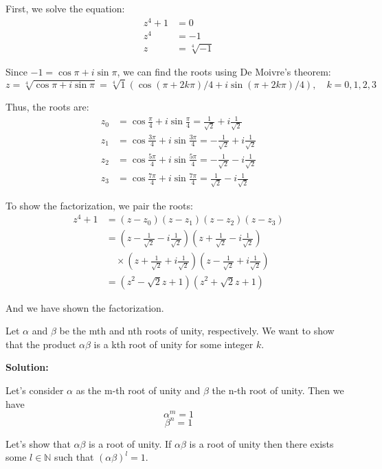 \documentclass[
	12pt, %
	fleqn, %
	a4paper, %
]{LegrandOrangeBook}
\begin{document}
First, we solve the equation:
\begin{align*}
z^4 + 1 &= 0 \\
z^4 &= -1 \\
z &= \sqrt[4]{-1}
\end{align*}

Since \( -1 = \cos \pi + i \sin \pi \), we can find the roots using De Moivre's theorem:
\[ z = \sqrt[4]{\cos \pi + i \sin \pi} = \sqrt[4]{1}(\cos (\pi + 2k\pi)/4 + i \sin (\pi + 2k\pi)/4), \quad k = 0,1,2,3 \]

Thus, the roots are:
\begin{align*}
z_0 &= \cos \frac{\pi}{4} + i \sin \frac{\pi}{4} = \frac{1}{\sqrt{2}} + i \frac{1}{\sqrt{2}} \\
z_1 &= \cos \frac{3\pi}{4} + i \sin \frac{3\pi}{4} = -\frac{1}{\sqrt{2}} + i \frac{1}{\sqrt{2}} \\
z_2 &= \cos \frac{5\pi}{4} + i \sin \frac{5\pi}{4} = -\frac{1}{\sqrt{2}} - i \frac{1}{\sqrt{2}} \\
z_3 &= \cos \frac{7\pi}{4} + i \sin \frac{7\pi}{4} = \frac{1}{\sqrt{2}} - i \frac{1}{\sqrt{2}}
\end{align*}

To show the factorization, we pair the roots:
\begin{align*}
z^4 + 1 &= (z - z_0)(z - z_1)(z - z_2)(z - z_3) \\
&= \left(z - \frac{1}{\sqrt{2}} - i \frac{1}{\sqrt{2}}\right)\left(z + \frac{1}{\sqrt{2}} - i \frac{1}{\sqrt{2}}\right) \\
&\quad \times \left(z + \frac{1}{\sqrt{2}} + i \frac{1}{\sqrt{2}}\right)\left(z - \frac{1}{\sqrt{2}} + i \frac{1}{\sqrt{2}}\right) \\
&= \left(z^2 - \sqrt{2}z + 1\right)\left(z^2 + \sqrt{2}z + 1\right)
\end{align*}

And we have shown the factorization.

\begin{exercise}
    Let \( \alpha \) and \( \beta \) be the mth and nth roots of unity, respectively. We want to show that the product \( \alpha\beta \) is a kth root of unity for some integer \( k \).
\end{exercise}
\textbf{Solution:}

Let's consider \( \alpha \) as the m-th root of unity and \( \beta \) the n-th root of unity. Then we have
\[ \alpha^m = 1 \]
\[ \beta^n = 1 \]

Let's show that \( \alpha\beta \) is a root of unity. If \( \alpha\beta \) is a root of unity then there exists some \( l \in \mathbb{N} \) such that \( (\alpha\beta)^l = 1 \).
\end{document}
